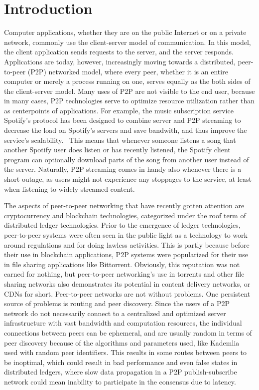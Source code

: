 \chapter{Introduction}
\label{Introduction}

Computer applications, whether they are on the public Internet or on a private network, commonly use the client-server model of communication. In this model, the client application sends requests to the server, and the server responds. Applications are today, however, increasingly moving towards a distributed, peer-to-peer (P2P) networked model, where every peer, whether it is an entire computer or merely a process running on one, serves equally as the both sides of the client-server model. Many uses of P2P are not visible to the end user, because in many cases, P2P technologies serve to optimize resource utilization rather than as centerpoints of applications. For example, the music subscription service Spotify's protocol has been designed to combine server and P2P streaming to decrease the load on Spotify's servers and save bandwith, and thus improve the service's scalability.~\cite{Kreitz_undated-yp} This means that whenever someone listens a song that another Spotify user does listen or has recently listened, the Spotify client program can optionally download parts of the song from another user instead of the server. Naturally, P2P streaming comes in handy also whenever there is a short outage, as users might not experience any stoppages to the service, at least when listening to widely streamed content. 

The aspects of peer-to-peer networking that have recently gotten attention are cryptocurrency and blockchain technologies, categorized under the roof term of distributed ledger technologies. Prior to the emergence of ledger technologies, peer-to-peer systems were often seen in the public light as a technology to work around regulations and for doing lawless activities. This is partly because before their use in blockchain applications, P2P systems were popularized for their use in file sharing applications like Bittorrent. Obviously, this reputation was not earned for nothing, but peer-to-peer networking's use in torrents and other file sharing networks also demonstrates its potential in content delivery networks, or CDNs for short. Peer-to-peer networks are not without problems. One persistent source of problems is routing and peer discovery. Since the users of a P2P network do not necessarily connect to a centralized and optimized server infrastructure with vast bandwidth and computation resources, the individual connections between peers can be ephemeral, and are usually random in terms of peer discovery because of the algorithms and parameters used, like Kademlia used with random peer identifiers. This results in some routes between peers to be inoptimal, which could result in bad performance and even false states in distributed ledgers, where slow data propagation in a P2P publish-subscribe network could mean inability to participate in the consensus due to latency.

